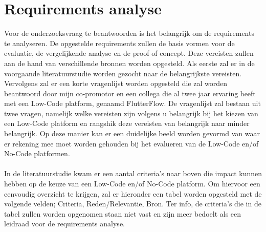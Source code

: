 \section*{Requirements analyse}
\label{sec:requirements-analyse}
Voor de onderzoeksvraag te beantwoorden is het belangrijk om de requirements te analyseren. De opgestelde requirements zullen de basis vormen voor 
de evaluatie, de vergelijkende analyse en de proof of concept. Deze vereisten zullen aan de hand van verschillende bronnen worden opgesteld. Als eerste zal 
er in de voorgaande literatuurstudie worden gezocht naar de belangrijkste vereisten. Vervolgens zal er een korte vragenlijst worden opgesteld die zal worden 
beantwoord door mijn co-promotor en een collega die al twee jaar ervaring heeft met een Low-Code platform, genaamd FlutterFlow. De vragenlijst zal bestaan uit
twee vragen, namelijk welke vereisten zijn volgens u belangrijk bij het kiezen van een Low-Code platform en rangshik deze vereisten van belangrijk naar minder belangrijk. Op deze
manier kan er een duidelijke beeld worden gevormd van waar er rekening mee moet worden gehouden bij het evalueren van de Low-Code en/of No-Code platformen.
\\
\\
In de literatuurstudie kwam er een aantal criteria's naar boven die impact kunnen hebben op de keuze van een Low-Code en/of No-Code platform.
Om hiervoor een eenvoudig overzicht te krijgen, zal er hieronder een tabel worden opgesteld met de volgende velden; Criteria, Reden/Relevantie, Bron. 
Ter info, de criteria's die in de tabel zullen worden opgenomen staan niet vast en zijn meer bedoelt als een leidraad voor de requirements analyse.
\\
\\


